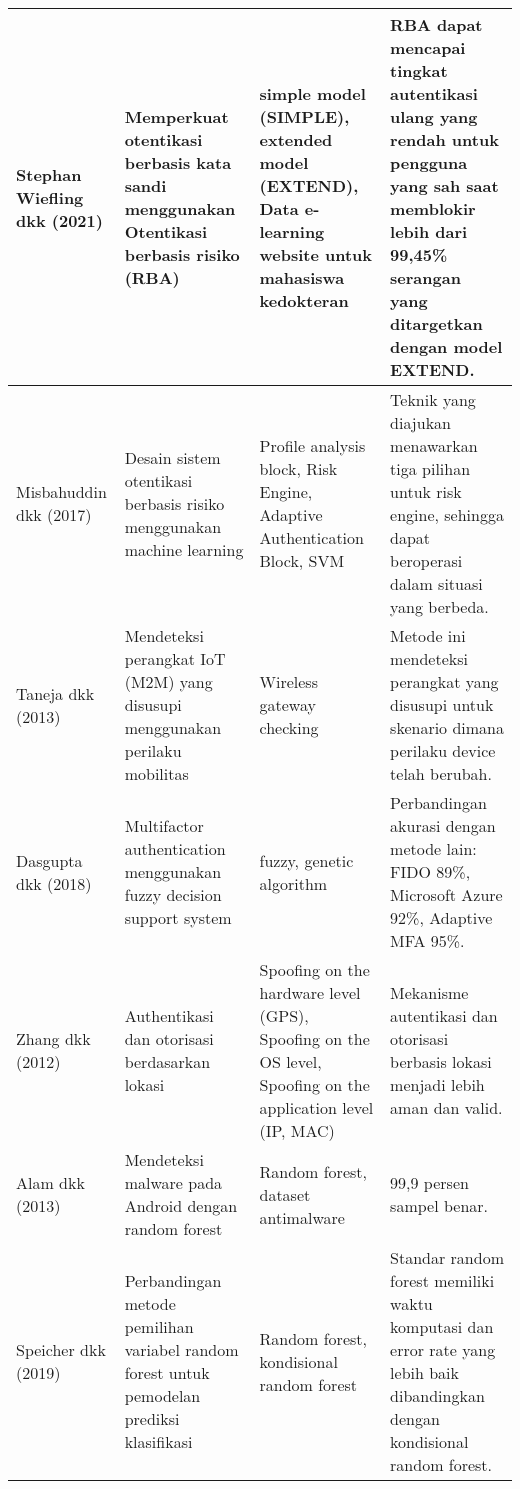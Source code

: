 \begin{longtable}{|p{1.7cm}|p{3.8cm}|p{3.5cm}|p{5cm}|}
    \hline
    Stephan Wiefling dkk (2021) & Memperkuat otentikasi berbasis kata sandi menggunakan Otentikasi berbasis risiko (RBA) & simple model (SIMPLE), extended model (EXTEND), Data e-learning website untuk mahasiswa kedokteran & RBA dapat mencapai tingkat autentikasi ulang yang rendah untuk pengguna yang sah saat memblokir lebih dari 99,45\% serangan yang ditargetkan dengan model EXTEND. \\
    \hline
    Misbahuddin dkk (2017) & Desain sistem otentikasi berbasis risiko menggunakan machine learning & Profile analysis block, Risk Engine, Adaptive Authentication Block, SVM & Teknik yang diajukan menawarkan tiga pilihan untuk risk engine, sehingga dapat beroperasi dalam situasi yang berbeda. \\
    \hline
    Taneja dkk (2013) & Mendeteksi perangkat IoT (M2M) yang disusupi menggunakan perilaku mobilitas & Wireless gateway checking & Metode ini mendeteksi perangkat yang disusupi untuk skenario dimana perilaku device telah berubah. \\
    \hline
    Dasgupta dkk (2018) & Multifactor authentication menggunakan fuzzy decision support system & fuzzy, genetic algorithm & Perbandingan akurasi dengan metode lain: FIDO 89\%, Microsoft Azure 92\%, Adaptive MFA 95\%. \\
    \hline
    Zhang dkk (2012) & Authentikasi dan otorisasi berdasarkan lokasi & Spoofing on the hardware level (GPS), Spoofing on the OS level, Spoofing on the application level (IP, MAC) & Mekanisme autentikasi dan otorisasi berbasis lokasi menjadi lebih aman dan valid. \\
    \hline
    Alam dkk (2013) & Mendeteksi malware pada Android dengan random forest & Random forest, dataset antimalware & 99,9 persen sampel benar. \\
    \hline
    Speicher dkk (2019) & Perbandingan metode pemilihan variabel random forest untuk pemodelan prediksi klasifikasi & Random forest, kondisional random forest & Standar random forest memiliki waktu komputasi dan error rate yang lebih baik dibandingkan dengan kondisional random forest. \\
    \hline
\end{longtable}
